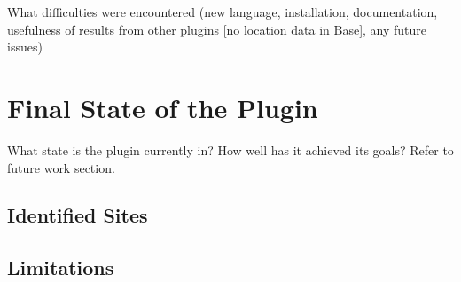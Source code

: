 What difficulties were encountered (new language, installation, documentation, usefulness of results from other plugins [no location data in Base], any future issues)

\section{Final State of the Plugin}

What state is the plugin currently in? How well has it achieved its goals? Refer to future work section.

\subsection{Identified Sites}

\subsection{Limitations}
